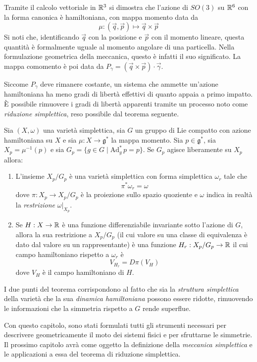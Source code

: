 Tramite il calcolo vettoriale in $\mathbb{R}^3$ si dimostra che l'azione di $SO(3)$ su $\mathbb{R}^6$ con la forma canonica è hamiltoniana, con mappa momento data da 
\begin{equation*}
\mu: (\vec{q},\vec{p}) \mapsto \vec{q} \times \vec{p}
\end{equation*} 
Si noti che, identificando $\vec{q}$ con la posizione e $\vec{p}$ con il momento lineare, questa quantità è formalmente uguale al momento angolare di una particella. Nella formulazione geometrica della meccanica, questo è infatti il suo significato. La mappa comomento è poi data da $P_{\gamma}=(\vec{q} \times \vec{p}) \cdot  \vec{\gamma}$.

Siccome $P_\gamma$ deve rimanere costante, un sistema che ammette un'azione hamiltoniana ha meno gradi di libertà effettivi di quanto appaia a primo impatto. È possibile rimuovere i gradi di libertà apparenti tramite un processo noto come \emph{riduzione simplettica}, reso possibile dal teorema seguente.

\begin{theorem}
  Sia $(X,\omega)$ una varietà simplettica, sia $G$ un gruppo di Lie compatto con azione hamiltoniana su $X$ e sia $\mu:  X \to \mathfrak{g}^*$ la mappa momento. Sia $p \in \mathfrak{g}^*$, sia $X_p = \mu^{-1}(p)$ e sia $G_p = \{g \in G \mid \mathrm{Ad}_g^*\, p = p\}$. Se $G_p$ agisce liberamente su $X_p$ allora:
  \begin{enumerate}
    \item L'insieme $X_p/G_p$ è una varietà simplettica con forma simplettica $\omega_r$ tale che \begin{equation*}
    \pi^* \omega_r = \omega
    \end{equation*} 
    dove $\pi:X_p \to X_p/G_p$ è la proiezione sullo spazio quoziente e $\omega$ indica in realtà la \emph{restrizione} $\omega|_{X_p}$.
    \item Se $H:X\to \mathbb{R}$ è una funzione differenziabile invariante sotto l'azione di $G$, allora la sua restrizione a $X_p/G_p$ (il cui valore su una classe di equivalenza è dato dal valore su un rappresentante) è una funzione $H_r:X_p/G_p \to \mathbb{R}$ il cui campo hamiltoniano rispetto a $\omega_r$ è \begin{equation*}
    V_{H_r} = D \pi(V_H)
    \end{equation*}
    dove $V_H$ è il campo hamiltoniano di $H$.
  \end{enumerate}
\end{theorem}
\begin{remark}
  I due punti del teorema corrispondono al fatto che sia la \emph{struttura simplettica} della varietà che la sua \emph{dinamica hamiltoniana} possono essere ridotte, rimuovendo le informazioni che la simmetria rispetto a $G$ rende superflue.
\end{remark}

Con questo capitolo, sono stati formulati tutti gli strumenti necessari per descrivere geometricamente il moto dei sistemi fisici e per sfruttarne le simmetrie. Il prossimo capitolo avrà come oggetto la definizione della \emph{meccanica simplettica} e le applicazioni a essa del teorema di riduzione simplettica.